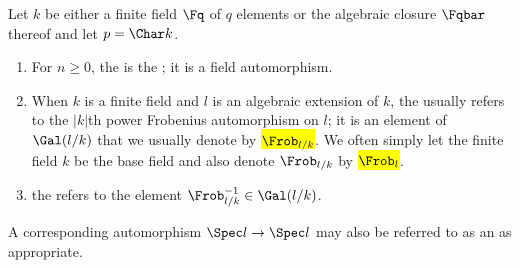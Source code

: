 \begin{definition} \label{definition:arithmetic_and_geometric_frobenius_automorphisms_of_algebraic_extensions_of_finite_fields}
    Let $k$ be either a finite field $\Fq$ of $q$ elements or the algebraic closure $\Fqbar$ thereof and let $p = \Char k$. 
    \begin{enumerate}

        \item For $n \geq 0$, the  is the ; it is a field automorphism.

        \item When $k$ is a finite field and $l$ is an algebraic extension of $k$, the  usually refers to the $|k|$th power Frobenius automorphism on $l$; it is an element of $\Gal(l/k)$ that we usually denote by \hl{$\Frob_{l/k}$}. We often simply let the finite field $k$ be the base field and also denote $\Frob_{l/k}$ by \hl{$\Frob_{l}$}. 
        \item the  refers to the element $\Frob_{l/k}^{-1} \in \Gal(l/k)$.
    \end{enumerate}
    A corresponding automorphism $\Spec l \to \Spec l$ may also be referred to as an  as appropriate.
\end{definition}